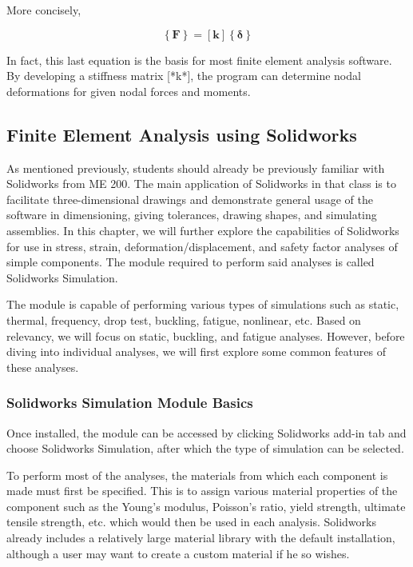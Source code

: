 \documentclass[a4paper,openany,nobib]{tufte-book}
\begin{document}
{{More concisely,

$$\left\{ \mathbf{F} \right\} = \left[ \mathbf{k} \right]\left\{ \bm\delta \right\}$$

In fact, this last equation is the basis for most finite element
analysis software. By developing a stiffness matrix [*k*], the program
can determine nodal deformations for given nodal forces and moments.

\subsection{Finite Element Analysis using Solidworks}
\label{finite-element-analysis-using-solidworks}
As mentioned previously, students should already be previously familiar
with Solidworks from ME 200. The main application of Solidworks in that
class is to facilitate three-dimensional drawings and demonstrate
general usage of the software in dimensioning, giving tolerances,
drawing shapes, and simulating assemblies. In this chapter, we will
further explore the capabilities of Solidworks for use in stress,
strain, deformation/displacement, and safety factor analyses of simple
components. The module required to perform said analyses is called
Solidworks Simulation.

The module is capable of performing various types of simulations such as
static, thermal, frequency, drop test, buckling, fatigue, nonlinear,
etc. Based on relevancy, we will focus on static, buckling, and fatigue
analyses. However, before diving into individual analyses, we will first
explore some common features of these analyses.

\subsubsection{Solidworks Simulation Module Basics}
\label{solidworks-simulation-module-basics}
Once installed, the module can be accessed by clicking Solidworks add-in
tab and choose Solidworks Simulation, after which the type of simulation
can be selected.

To perform most of the analyses, the materials from which each component
is made must first be specified. This is to assign various material
properties of the component such as the Young's modulus, Poisson's
ratio, yield strength, ultimate tensile strength, etc. which would then
be used in each analysis. Solidworks already includes a relatively large
material library with the default installation, although a user may want
to create a custom material if he so wishes.

}}
\end{document}
